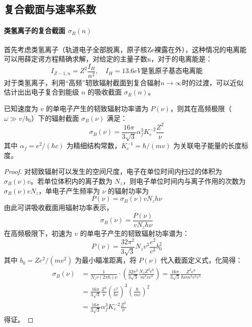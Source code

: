 \subsection{复合截面与速率系数}

\paragraph{类氢离子的复合截面 $\sigma_R(n)$}
首先考虑类氢离子（轨道电子全部脱离，原子核Ze裸露在外），这种情况的电离能可以用薛定谔方程精确求解，对给定的主量子数n，对于的电离能是：
\begin{equation}
    I_{Z-1, n} = Z^2\frac{I_H}{n^2}, \quad \text{$I_H = 13.6eV$是氢原子基态电离能} \nonumber
\end{equation}
对于类氢离子，利用“高频”轫致辐射截面到复合辐射$n\rightarrow \infty$时的过渡，可以近似估计出出电子复合到能级 $n$ 的吸收截面 $\sigma_R(n)$。

\begin{theorem}[高频极限下的韧致辐射截面]
    已知速度为 $v$ 的单电子产生的韧致辐射功率谱为 $P(\nu)$，则其在高频极限（$\omega \gg v/b_0$）下的辐射截面 $\sigma_B(\nu)$ 满足：
    \begin{equation}\label{eq:brems_sigma_highfreq}
        \sigma_B(\nu) = \frac{16\pi}{3\sqrt{3}} \alpha_f^3 K_e^{-2} \frac{Z^2}{\nu}
    \end{equation}
    其中 $\alpha_f = e^2 / (\hbar c)$ 为精细结构常数，$K_e^{-1} = \hbar / (mv)$ 为关联电子能量的长度标度。
\end{theorem}

\begin{proof}
    对韧致辐射可以发生的空间尺度，电子在单位时间内扫过的体积为 $\sigma_B(\nu)v$。若单位体积内的离子数为 $N_z$，则电子单位时间内与离子作用的次数为 $\sigma_B(\nu)v N_z$，单电子产生频率为 $\nu$ 的辐射功率为 
    \begin{equation}
        P(\nu) = \sigma_B(\nu)v N_z h \nu \nonumber
    \end{equation}
    由此可讲吸收截面用辐射功率表示，
    \begin{equation}
        \sigma_B(\nu)  = \frac{P(\nu)}{v N_z h \nu} \nonumber
    \end{equation}
    在高频极限下，初速为 $v$ 的单电子产生的韧致辐射功率谱为：
    \begin{equation}
        P(\nu) = \frac{32\pi^2}{3\sqrt{3}} N_z v^3 \frac{e^2}{c^3} b_0^2 \nonumber
    \end{equation}
    其中 $b_0 = Ze^2 / (m v^2)$ 为最小瞄准距离，将 $P(\nu)$ 代入截面定义式，化简得：
    \begin{align}
        \sigma_B(\nu) &= \frac{1}{N_z v (2\pi\hbar) \nu} \cdot \left( \frac{32\pi^2}{3\sqrt{3}} \frac{N_z Z^2 e^6}{m^2 v c^3} \right) = \frac{16\pi}{3\sqrt{3}} \frac{Z^2 e^6}{\hbar \nu m^2 v^2 c^3} \nonumber \\
                    &= \frac{16\pi}{3\sqrt{3}} \frac{Z^2}{\nu} \left( \frac{e^2}{\hbar c} \right)^3 \left( \frac{\hbar}{m v} \right)^2 \nonumber \\
                    &= \frac{16\pi}{3\sqrt{3}} \alpha_f^3 K_e^{-2} \frac{Z^2}{\nu}
    \end{align}
    得证。
\end{proof}

